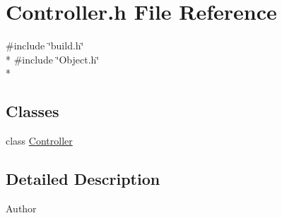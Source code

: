 \section{Controller.\-h File Reference}
\label{_controller_8h}
{\ttfamily \#include \char`\"{}build.\-h\char`\"{}}\\*
{\ttfamily \#include \char`\"{}Object.\-h\char`\"{}}\\*
\subsection*{Classes}
\begin{DoxyCompactItemize}
\item 
class \hyperlink{class_controller}{Controller}
\end{DoxyCompactItemize}


\subsection{Detailed Description}
\begin{DoxyAuthor}{Author}

\end{DoxyAuthor}
